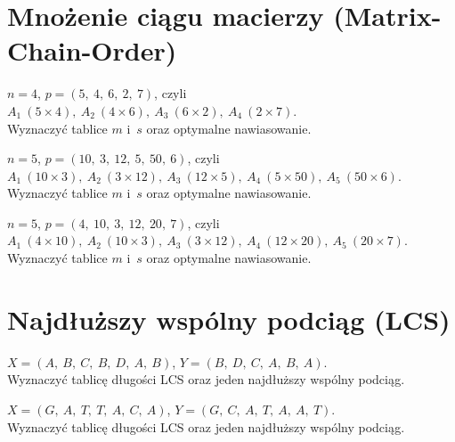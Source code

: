 \section{Mnożenie ciągu macierzy (Matrix-Chain-Order)}

\begin{example}
	$n = 4$, \quad $p = (5,\ 4,\ 6,\ 2,\ 7)$, czyli\\
	$A_1\ (5\times 4),\ A_2\ (4\times 6),\ A_3\ (6\times 2),\ A_4\ (2\times 7)$.\\
	Wyznaczyć tablice $m$ i~$s$ oraz optymalne nawiasowanie.
\end{example}

\begin{example}
	$n = 5$, \quad $p = (10,\ 3,\ 12,\ 5,\ 50,\ 6)$, czyli\\
	$A_1\ (10\times 3),\ A_2\ (3\times 12),\ A_3\ (12\times 5),\ A_4\ (5\times 50),\ A_5\ (50\times 6)$.\\
	Wyznaczyć tablice $m$ i~$s$ oraz optymalne nawiasowanie.
\end{example}

	\begin{example}
		$n = 5$, \quad $p = (4,\ 10,\ 3,\ 12,\ 20,\ 7)$, czyli\\
		$A_1\ (4\times 10),\ A_2\ (10\times 3),\ A_3\ (3\times 12),\ A_4\ (12\times 20),\ A_5\ (20\times 7)$.\\
		Wyznaczyć tablice $m$ i~$s$ oraz optymalne nawiasowanie.
	\end{example}

\section{Najdłuższy wspólny podciąg (LCS)}

\begin{example}
	$X = (A,\ B,\ C,\ B,\ D,\ A,\ B)$, \quad $Y = (B,\ D,\ C,\ A,\ B,\ A)$.\\
	Wyznaczyć tablicę długości LCS oraz jeden najdłuższy wspólny podciąg.
\end{example}

\begin{example}
	$X = (G,\ A,\ T,\ T,\ A,\ C,\ A)$, \quad $Y = (G,\ C,\ A,\ T,\ A,\ A,\ T)$.\\
	Wyznaczyć tablicę długości LCS oraz jeden najdłuższy wspólny podciąg.
\end{example}

